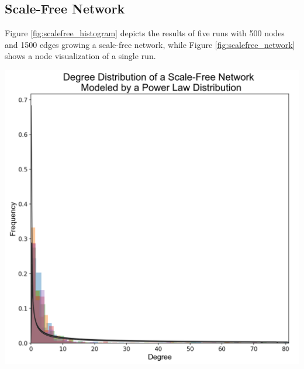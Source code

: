 \documentclass[journal]{IEEEtran}
\begin{document}
\newpage

\subsection{Scale-Free Network}

\noindent Figure \ref{fig:scalefree_histogram} depicts the results of five runs with 500 nodes and 1500 edges growing a scale-free network, while Figure \ref{fig:scalefree_network} shows a node visualization of a single run.

\begingroup
    \centering
    \medskip
    \includegraphics[width=\columnwidth]{images/sf_dist_5.png}
    \label{fig:scalefree_histogram}
    \medskip
\endgroup

\bigskip
\bigskip
\bigskip
\end{document}
